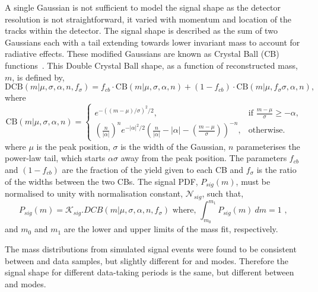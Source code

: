 A single Gaussian is not sufficient to model the signal shape as the detector resolution is not straightforward, it varied with momentum and location of the tracks within the detector. The signal shape is described as the sum of two Gaussians each with a tail extending towards lower invariant mass to account for radiative effects. These modified Gaussians are known as Crystal Ball (CB) functions~\cite{Skwarnicki:1986xj}. This Double Crystal Ball shape, as a function of reconstructed mass, $m$, is defined by,
\begin{equation}
\mathrm{DCB}(m| \mu,\sigma,\alpha,n,f_{\sigma}) = f_{cb} \cdot \mathrm{CB}(m| \mu,\sigma,\alpha,n) + (1-f_{cb}) \cdot \mathrm{CB}(m|\mu,f_{\sigma}\sigma,\alpha,n),
\label{DCBshape}
\end{equation}
where
\begin{equation*}
  \mathrm{CB}(m| \mu,\sigma,\alpha,n)=
\begin{cases}
    e^{-((m-\mu)/ \sigma)^2/2},                                   & \text{if } \frac{m-\mu}{\sigma} \geq - \alpha, \\
   \left ( \frac{n}{|\alpha|} \right ) ^n e^{-|\alpha|^2/2} \left ( \frac{n}{|\alpha|} - |\alpha| - \left ( \frac{m-\mu}{\sigma} \right ) \right ) ^{-n} ,    & \text{otherwise.}
\end{cases}
\end{equation*}
where $\mu$ is the peak position, $\sigma$ is the width of the Gaussian, $n$ parameterises the power-law tail, which starts $\alpha\sigma$ away from the peak position. The parameters $f_{cb}$ and $(1-f_{cb})$ are the fraction of the yield given to each CB and $f_{\sigma}$ is the ratio of the widths between the two CBs. The signal PDF, $P_{sig}(m)$, must be normalised to unity with normalisation constant, $\mathcal{N}_{sig}$, such that,
\begin{equation}
P_{sig}(m) = \mathcal{K}_{sig} . DCB(m| \mu,\sigma,\alpha,n,f_{\sigma}) \text{	where, } \int_{m_0}^{m_1} P_{sig}(m)\ dm = 1 \text{ , }
\end{equation}
and $m_0$ and $m_1$ are the lower and upper limits of the mass fit, respectively.

The \Bm mass distributions from simulated signal events were found to be consistent between \runone and \runtwo data samples, but slightly different for \kpi and \kpipipi modes. Therefore the signal shape for different data-taking periods is the same, but different between \kpi and \kpipipi modes. 

